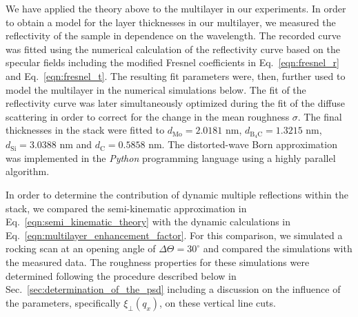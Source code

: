 \label{sec:numerical_simulations} We have applied the theory above to the multilayer in our experiments. In order to obtain a model for the layer thicknesses in our multilayer, we measured the reflectivity of the sample in dependence on the wavelength. The recorded curve was fitted using the numerical calculation of the reflectivity curve based on the specular fields including the modified Fresnel coefficients in Eq.~\eqref{eqn:fresnel_r} and Eq.~\eqref{eqn:fresnel_t}. The resulting fit parameters were, then, further used to model the multilayer in the numerical simulations below. The fit of the reflectivity curve was later simultaneously optimized during the fit of the diffuse scattering in order to correct for the change in the mean roughness $\sigma$. The final thicknesses in the stack were fitted to $d_\text{Mo} = 2.0181$ nm, $d_\text{B$_4$C} = 1.3215$ nm, $d_\text{Si} = 3.0388$ nm and $d_\text{C} = 0.5858$ nm. The distorted-wave Born approximation was implemented in the \emph{Python} programming language using a highly parallel algorithm.

In order to determine the contribution of dynamic multiple reflections within the stack, we compared the semi-kinematic approximation in Eq.~\eqref{eqn:semi_kinematic_theory} with the dynamic calculations in Eq.~\eqref{eqn:multilayer_enhancement_factor}. For this comparison, we simulated a rocking scan at an opening angle of $\Delta \Theta = 30^\circ$ and compared the simulations with the measured data. The roughness properties for these simulations were determined following the procedure described below in Sec.~\ref{sec:determination_of_the_psd} including a discussion on the influence of the parameters, specifically $\xi_\perp(q_x)$, on these vertical line cuts.

